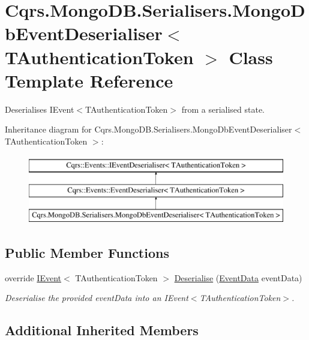 \hypertarget{classCqrs_1_1MongoDB_1_1Serialisers_1_1MongoDbEventDeserialiser}{}\section{Cqrs.\+Mongo\+D\+B.\+Serialisers.\+Mongo\+Db\+Event\+Deserialiser$<$ T\+Authentication\+Token $>$ Class Template Reference}
\label{classCqrs_1_1MongoDB_1_1Serialisers_1_1MongoDbEventDeserialiser}


Deserialises I\+Event$<$\+T\+Authentication\+Token$>$ from a serialised state.  


Inheritance diagram for Cqrs.\+Mongo\+D\+B.\+Serialisers.\+Mongo\+Db\+Event\+Deserialiser$<$ T\+Authentication\+Token $>$\+:\begin{figure}[H]
\begin{center}
\leavevmode
\includegraphics[height=3.000000cm]{classCqrs_1_1MongoDB_1_1Serialisers_1_1MongoDbEventDeserialiser}
\end{center}
\end{figure}
\subsection*{Public Member Functions}
\begin{DoxyCompactItemize}
\item 
override \hyperlink{interfaceCqrs_1_1Events_1_1IEvent}{I\+Event}$<$ T\+Authentication\+Token $>$ \hyperlink{classCqrs_1_1MongoDB_1_1Serialisers_1_1MongoDbEventDeserialiser_a2ea63367d97bf66e3dffcabb8c53005e_a2ea63367d97bf66e3dffcabb8c53005e}{Deserialise} (\hyperlink{classCqrs_1_1Events_1_1EventData}{Event\+Data} event\+Data)
\begin{DoxyCompactList}\small\item\em Deserialise the provided {\itshape event\+Data}  into an I\+Event$<$\+T\+Authentication\+Token$>$. \end{DoxyCompactList}\end{DoxyCompactItemize}
\subsection*{Additional Inherited Members}


